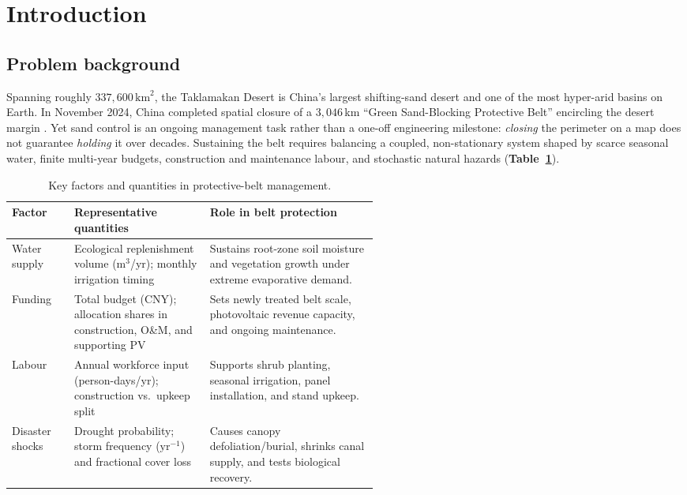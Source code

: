 \documentclass{mcmthesis}
\begin{document}
\hypersetup{pageanchor=false}
\maketitle
\hypersetup{pageanchor=true}

\pagestyle{main}
\begingroup
\small
\setlength{\parskip}{0pt}
\tableofcontents
\endgroup
\clearpage

\section{Introduction}
\subsection{Problem background}
Spanning roughly $337{,}600\,\text{km}^2$, the Taklamakan Desert is China's largest shifting-sand desert and one of the most hyper-arid basins on Earth. In November 2024, China completed spatial closure of a $3{,}046$\,km ``Green Sand-Blocking Protective Belt'' encircling the desert margin \cite{REF12}. Yet sand control is an ongoing management task rather than a one-off engineering milestone: \emph{closing} the perimeter on a map does not guarantee \emph{holding} it over decades. Sustaining the belt requires balancing a coupled, non-stationary system shaped by scarce seasonal water, finite multi-year budgets, construction and maintenance labour, and stochastic natural hazards \cite{REF06} (\textbf{Table~\ref{tab:protection-factors}}).

\begin{table}[htbp]
  \centering
  \caption{Key factors and quantities in protective-belt management.}
  \label{tab:protection-factors}
  \begingroup\small
  \renewcommand{\arraystretch}{1.18}
  \begin{tabularx}{\linewidth}{@{}>{\raggedright\arraybackslash}p{0.17\linewidth}
    >{\raggedright\arraybackslash}p{0.37\linewidth}
    >{\raggedright\arraybackslash}X@{}}
    \toprule
    \textbf{Factor} & \textbf{Representative quantities} & \textbf{Role in belt protection} \\
    \midrule
    Water supply & Ecological replenishment volume ($\text{m}^3$/yr); monthly irrigation timing
      & Sustains root-zone soil moisture and vegetation growth under extreme evaporative demand. \\
    Funding & Total budget (CNY); allocation shares in construction, O\&M, and supporting PV
      & Sets newly treated belt scale, photovoltaic revenue capacity, and ongoing maintenance. \\
    Labour & Annual workforce input (person-days/yr); construction vs.\ upkeep split
      & Supports shrub planting, seasonal irrigation, panel installation, and stand upkeep. \\
    Disaster shocks & Drought probability; storm frequency ($\text{yr}^{-1}$) and fractional cover loss
      & Causes canopy defoliation/burial, shrinks canal supply, and tests biological recovery. \\
    \bottomrule
  \end{tabularx}
  \endgroup
\end{table}
\end{document}
